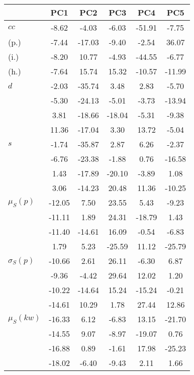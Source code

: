 \begin{table}[h!]
\begin{center}
\begin{tabular}{| l | c | c | c | c | c |}\hline
 & PC1 & PC2 & PC3 & PC4 & PC5 \\\hline
$cc$ & -8.62  & -4.03  & -6.03  & -51.91  & -7.75 \\\hline
(p.) & -7.44  & -17.03  & -9.40  & -2.54  & 36.07 \\\hline
(i.) & -8.20  & 10.77  & -4.93  & -44.55  & -6.77 \\\hline
(h.) & -7.64  & 15.74  & 15.32  & -10.57  & -11.99 \\\hline
$d$ & -2.03  & -35.74  & 3.48  & 2.83  & -5.70 \\\hline
 & -5.30  & -24.13  & -5.01  & -3.73  & -13.94 \\\hline
 & 3.81  & -18.66  & -18.04  & -5.31  & -9.38 \\\hline
 & 11.36  & -17.04  & 3.30  & 13.72  & -5.04 \\\hline
$s$ & -1.74  & -35.87  & 2.87  & 6.26  & -2.37 \\\hline
 & -6.76  & -23.38  & -1.88  & 0.76  & -16.58 \\\hline
 & 1.43  & -17.89  & -20.10  & -3.89  & 1.08 \\\hline
 & 3.06  & -14.23  & 20.48  & 11.36  & -10.25 \\\hline
$\mu_S(p)$ & -12.05  & 7.50  & 23.55  & 5.43  & -9.23 \\\hline
 & -11.11  & 1.89  & 24.31  & -18.79  & 1.43 \\\hline
 & -11.40  & -14.61  & 16.09  & -0.54  & -6.83 \\\hline
 & 1.79  & 5.23  & -25.59  & 11.12  & -25.79 \\\hline
$\sigma_S(p)$ & -10.66  & 2.61  & 26.11  & -6.30  & 6.87 \\\hline
 & -9.36  & -4.42  & 29.64  & 12.02  & 1.20 \\\hline
 & -10.22  & -14.64  & 15.24  & -15.24  & -0.21 \\\hline
 & -14.61  & 10.29  & 1.78  & 27.44  & 12.86 \\\hline
$\mu_S(kw)$ & -16.33  & 6.12  & -6.83  & 13.15  & -21.70 \\\hline
 & -14.55  & 9.07  & -8.97  & -19.07  & 0.76 \\\hline
 & -16.88  & 0.89  & -1.61  & 17.98  & -25.23 \\\hline
 & -18.02  & -6.40  & -9.43  & 2.11  & 1.66 \\\hline

\end{tabular}
\end{center}
\end{table}
